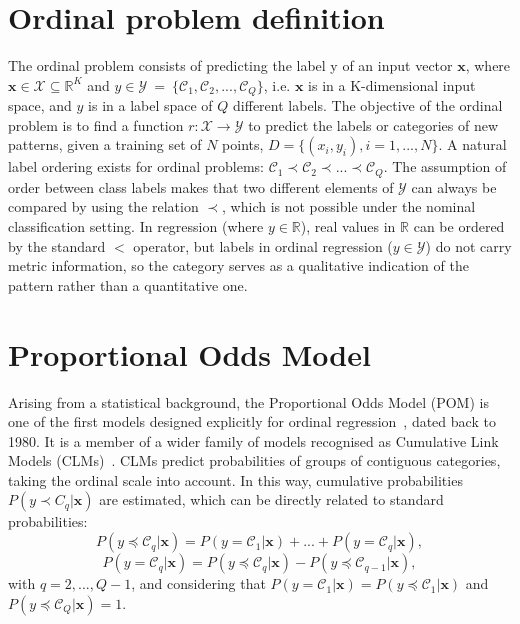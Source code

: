 \documentclass[journal]{IEEEtran}
\begin{document}
	\section{Ordinal problem definition}
	\label{sect:ordinalproblem}
	The ordinal problem consists of predicting the label y of an input vector $\mathbf{x}$, where $\mathbf{x} \in \mathcal{X} \subseteq \mathds{R}^K$ and $y \in \mathcal{Y}~=~\{\mathcal{C}_1, \mathcal{C}_2, ..., \mathcal{C}_Q\}$, i.e. $\mathbf{x}$ is in a K-dimensional input space, and $y$ is in a label space of $Q$ different labels. The objective of the ordinal problem is to find a function $r : \mathcal{X} \rightarrow \mathcal{Y}$ to predict the labels or categories of new patterns, given a training set of $N$ points, $D = \{(x_i, y_i), i = 1, ..., N\}$. A natural label ordering exists for ordinal problems: $\mathcal{C}_1 \prec \mathcal{C}_2 \prec ... \prec \mathcal{C}_Q$. The assumption of order between class labels makes that two different elements of $\mathcal{Y}$ can always be compared by using the relation $\prec$, which is not possible under the nominal classification setting. In regression (where $y \in \mathds{R}$), real values in $\mathds{R}$ can be ordered by the standard $<$ operator, but labels in ordinal regression ($y \in \mathcal{Y}$) do not carry metric information, so the category serves as a qualitative indication of the pattern rather than a quantitative one.
	
	\section{Proportional Odds Model}
	\label{sect:pom}
	Arising from a statistical background, the Proportional Odds Model (POM) is one of the first models designed explicitly for ordinal regression~\cite{mccullagh1980regression}, dated back to 1980. It is a member of a wider family of models recognised as Cumulative Link Models (CLMs)~\cite{agresti2010analysis}. CLMs predict probabilities of groups of contiguous categories, taking the ordinal scale into account. In this way, cumulative probabilities $P(y \prec C_q |\mathbf{x})$ are estimated, which can be directly related to standard probabilities:
	\begin{equation}
		P(y \preceq \mathcal{C}_q | \mathbf{x}) = P(y = \mathcal{C}_1 | \mathbf{x}) + ... + P(y = \mathcal{C}_q | \mathbf{x}),
	\end{equation}
	\begin{equation}
		P(y = \mathcal{C}_q | \mathbf{x}) = P(y \preceq \mathcal{C}_q | \mathbf{x}) - P(y \preceq \mathcal{C}_{q-1} | \mathbf{x}),
	\end{equation}
	with $q = 2, ..., Q-1$, and considering that $P(y = \mathcal{C}_1 | \mathbf{x}) = P(y \preceq \mathcal{C}_1 | \mathbf{x})$ and $P(y \preceq \mathcal{C}_Q | \mathbf{x}) = 1$.
	
\end{document}
